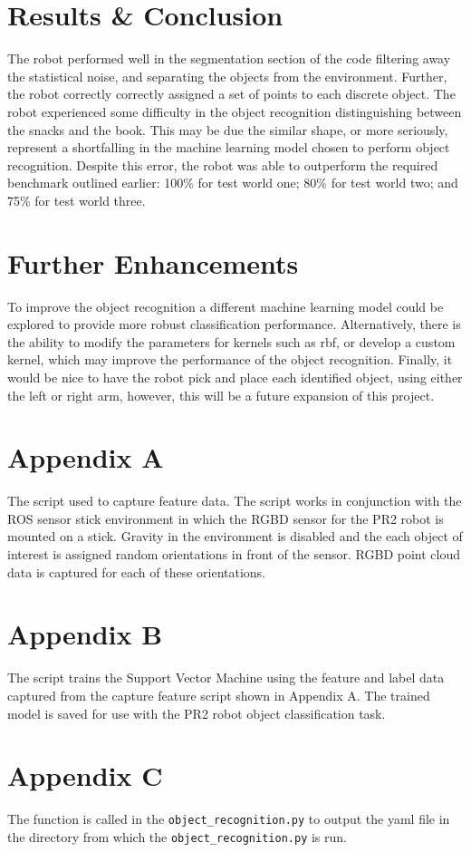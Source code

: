 \documentclass[a4paper]{article}
\begin{document}
\section{Results \& Conclusion}
The robot performed well in the segmentation section of the code filtering away the statistical noise, and separating the objects from the environment. Further, the robot correctly correctly assigned a set of points to each discrete object. The robot experienced some difficulty in the object recognition distinguishing between the snacks and the book. This may be due the similar shape, or more seriously, represent a shortfalling in the machine learning model chosen to perform object recognition. Despite this error, the robot was able to outperform the required benchmark outlined earlier: 100\% for test world one; 80\% for test world two; and 75\% for test world three.

\section{Further Enhancements}
To improve the object recognition a different machine learning model could be explored to provide more robust classification performance. Alternatively, there is the ability to modify the parameters for kernels such as rbf, or develop a custom kernel, which may improve the performance of the object recognition. Finally, it would be nice to have the robot pick and place each identified object, using either the left or right arm, however, this will be a future expansion of this project.
\clearpage

\section{Appendix A}
\lstset{
	frame=single,
	basicstyle=\ttfamily,
	numbers=left,
	showstringspaces=false,
}
The script used to capture feature data. The script works in conjunction with the ROS sensor stick environment in which the RGBD sensor for the PR2 robot is mounted on a stick. Gravity in the environment is disabled and the each object of interest is assigned random orientations in front of the sensor. RGBD point cloud data is captured for each of these orientations.
\tiny

\clearpage

\section{Appendix B}
\normalsize The script trains the Support Vector Machine using the feature and label data captured from the capture feature script shown in Appendix A. The trained model is saved for use with the PR2 robot object classification task.
\tiny

\newpage

\section{Appendix C}
\normalsize The function is called in the \verb|object_recognition.py| to output the yaml file in the directory from which the \verb|object_recognition.py| is run. 
\tiny

\end{document}
